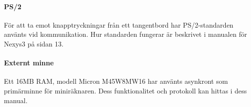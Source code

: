 \documentclass[main.tex]{subfiles}
\begin{document}
\paragraph{PS/2}
För att ta emot knapptryckningar från ett tangentbord har PS/2-standarden
använts vid kommunikation. Hur standarden fungerar är beskrivet i manualen för
Nexys3 på sidan 13.\cite{Nexys3}

\paragraph{Externt minne}
Ett 16MB RAM, modell Micron M45W8MW16 har använts asynkront som primärminne för
miniräknaren. Dess funktionalitet och protokoll kan hittas i dess
manual.\cite{m45}

\clearpage
\end{document}
